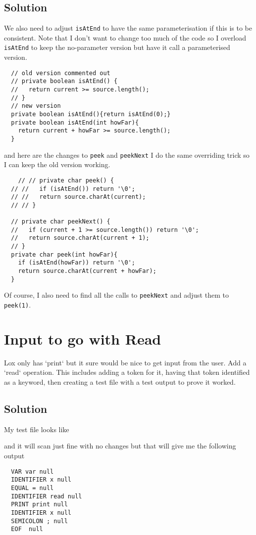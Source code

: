 \documentclass[twoside=false, DIV=14]{scrartcl}
\begin{document}
\subsection*{Solution}
We also need to adjust \lstinline|isAtEnd| to have the same parameterisation if this is to be consistent. Note that I don't want to change too much of the code so I overload \lstinline|isAtEnd| to keep the no-parameter version but have it call a parameterised version.

\begin{lstlisting}
  // old version commented out
  // private boolean isAtEnd() {
  //   return current >= source.length();
  // }
  // new version
  private boolean isAtEnd(){return isAtEnd(0);}
  private boolean isAtEnd(int howFar){
    return current + howFar >= source.length();
  }  
\end{lstlisting}
and here are the changes to \lstinline|peek| and \lstinline|peekNext| I do the same overriding trick so I can keep the old version working.
\begin{lstlisting}
    // // private char peek() {
  // //   if (isAtEnd()) return '\0';
  // //   return source.charAt(current);
  // // }

  // private char peekNext() {
  //   if (current + 1 >= source.length()) return '\0';
  //   return source.charAt(current + 1);
  // } 
  private char peek(int howFar){
    if (isAtEnd(howFar)) return '\0';
    return source.charAt(current + howFar);
  }
\end{lstlisting}
  Of course, I also need to find all the calls to \lstinline|peekNext| and adjust them to \lstinline|peek(1)|.

\section*{Input to go with Read}
  Lox only has `print` but it sure would be nice to get input from the user.  Add a `read` operation.  This includes adding a token for it, having that token identified as a keyword, then creating a test file with a test output to prove it worked.
\subsection*{Solution}
 My test file looks like



and it will scan just fine with no changes but that will give me the following output
 
\begin{lstlisting}
  VAR var null
  IDENTIFIER x null
  EQUAL = null
  IDENTIFIER read null
  PRINT print null
  IDENTIFIER x null
  SEMICOLON ; null
  EOF  null
\end{lstlisting}
\end{document}

